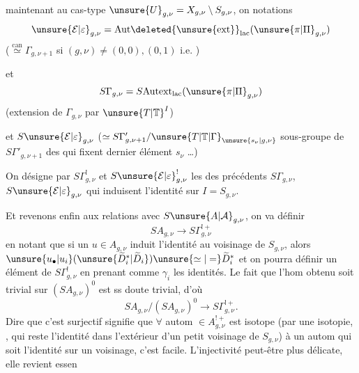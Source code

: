  maintenant au cas-type 
$\unsure{U}_{g,\nu}=X_{g,\nu}\setminus S_{g,\nu}$, on   notations
\[
\unsure{\mathcal E|\varepsilon}_{g,\nu}
=\mathrm{Aut}\deleted{\unsure{\mathrm{ext}}}_{\mathrm{lac}}
(\unsure{\pi|\Pi}_{g,\nu})
\]
($\stackrel{\mathrm{can}}{\simeq}\Gamma_{g,\nu+1}$ si $(g,\nu)\ne(0,0),(0,1)$ i.e. ) 

et
\[
S\Gamma_{g,\nu}=S\mathrm{Autext}_{\mathrm{lac}}(\unsure{\pi|\Pi}_{g,\nu})
\]
(extension de $\Gamma_{g,\nu}$ par $\unsure{T|\mathbb T}^I$)

et $S\unsure{\mathcal E|\varepsilon}_{g,\nu}$
($\simeq S\Gamma'_{g,\nu+1}/\unsure{T|\mathbb T|\Gamma}_{\unsure{s_\nu|g,\nu}}$
sous-groupe de $S\Gamma'_{g,\nu+1}$ des  qui fixent  dernier élément $s_\nu$ \ldots)

On désigne par $S\Gamma^{!}_{g,\nu}$ et $S\unsure{\mathcal{E}|\varepsilon}^{!}_{g,\nu}$ les  des précédents $S\Gamma_{g,\nu}$, $S\unsure{\mathcal{E}|\varepsilon}_{g,\nu}$ qui induisent l'identité sur $I=S_{g,\nu}$.

Et revenons enfin aux relations avec $S\unsure{A|\mathcal A}_{g,\nu}$, on va définir
\[
SA_{g,\nu}\longrightarrow S\Gamma^{!+}_{g,\nu}
\]
en  notant que si un $u\in A_{g,\nu}$ induit l'identité au voisinage de $S_{g,\nu}$, alors $\unsure{u_{\bullet}|u_i}(\unsure{\widetilde D_i^{*}|\widetilde D_i})\unsure{\simeq|=}\widetilde D_i^{*}$ et on pourra définir un élément de $S\Gamma^{!}_{g,\nu}$ en prenant comme $\gamma_i$ les identités. Le fait que l'hom obtenu soit trivial sur $(SA_{g,\nu})^0$ est ss doute trivial, d'où
\[
SA_{g,\nu}/(SA_{g,\nu})^0\longrightarrow S\Gamma^{!+}_{g,\nu}.
\]
Dire que c'est surjectif signifie que $\forall$ autom $\in A_{g,\nu}^{!+}$  est isotope (par une isotopie, , qui reste l'identité dans l'extérieur d'un petit voisinage de $S_{g,\nu}$) à un autom qui soit l'identité sur un voisinage, c'est facile. L'injectivité peut-être plus délicate, elle revient essen


